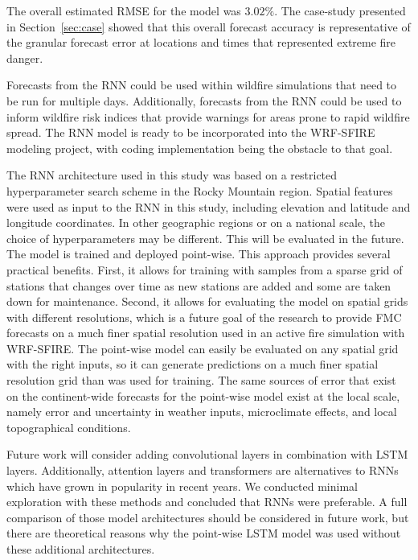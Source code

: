 \documentclass[fire,article,submit,pdftex,moreauthors]{Definitions/mdpi}
\begin{document}
The overall estimated RMSE for the model was $3.02\%$. The case-study presented in Section~\ref{sec:case} showed that this overall forecast accuracy is representative of the granular forecast error at locations and times that represented extreme fire danger.

Forecasts from the RNN could be used within wildfire simulations that need to be run for multiple days. Additionally, forecasts from the RNN could be used to inform wildfire risk indices that provide warnings for areas prone to rapid wildfire spread. The RNN model is ready to be incorporated into the WRF-SFIRE modeling project, with coding implementation being the obstacle to that goal.

The RNN architecture used in this study was based on a restricted hyperparameter search scheme in the Rocky Mountain region. Spatial features were used as input to the RNN in this study, including elevation and latitude and longitude coordinates. In other geographic regions or on a national scale, the choice of hyperparameters may be different. This will be evaluated in the future. The model is trained and deployed point-wise. This approach provides several practical benefits. First, it allows for training with samples from a sparse grid of stations that changes over time as new stations are added and some are taken down for maintenance. Second, it allows for evaluating the model on spatial grids with different resolutions, which is a future goal of the research to provide FMC forecasts on a much finer spatial resolution used in an active fire simulation with WRF-SFIRE. The point-wise model can easily be evaluated on any spatial grid with the right inputs, so it can generate predictions on a much finer spatial resolution grid than was used for training. The same sources of error that exist on the continent-wide forecasts for the point-wise model exist at the local scale, namely error and uncertainty in weather inputs, microclimate effects, and local topographical conditions. 

Future work will consider adding convolutional layers in combination with LSTM layers. Additionally, attention layers and transformers are alternatives to RNNs which have grown in popularity in recent years. We conducted minimal exploration with these methods and concluded that RNNs were preferable. A full comparison of those model architectures should be considered in future work, but there are theoretical reasons why the point-wise LSTM model was used without these additional architectures.
\end{document}

